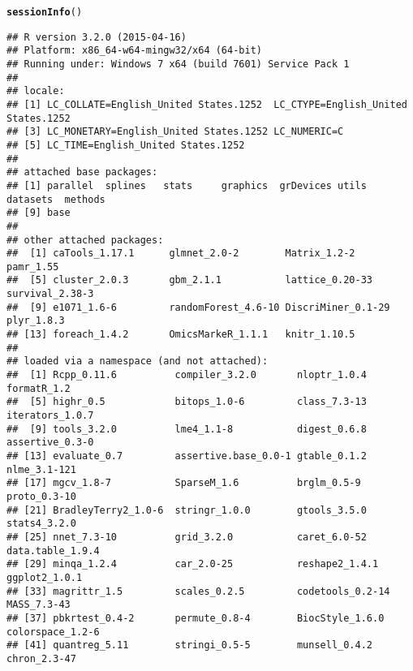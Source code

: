\documentclass[12pt]{article}\usepackage[]{graphicx}\usepackage[usenames,dvipsnames]{color}
\makeatletter
\newcommand{\hlstd}[1]{\textcolor[rgb]{0.345,0.345,0.345}{#1}}%
\newcommand{\hlkwd}[1]{\textcolor[rgb]{0.737,0.353,0.396}{\textbf{#1}}}%
\newenvironment{kframe}{%
 \def\at@end@of@kframe{}%
 \ifinner\ifhmode%
  \def\at@end@of@kframe{\end{minipage}}%
  \begin{minipage}{\columnwidth}%
 \fi\fi%
 \def\FrameCommand##1{\hskip\@totalleftmargin \hskip-\fboxsep
 \colorbox{shadecolor}{##1}\hskip-\fboxsep
     \hskip-\linewidth \hskip-\@totalleftmargin \hskip\columnwidth}%
 \MakeFramed {\advance\hsize-\width
   \@totalleftmargin\z@ \linewidth\hsize
   \@setminipage}}%
 {\par\unskip\endMakeFramed%
 \at@end@of@kframe}
\newenvironment{knitrout}{}{} %
\makeatother
\begin{document}
\newpage
\begin{knitrout}
\color{fgcolor}\begin{kframe}
\begin{alltt}
\hlkwd{sessionInfo}\hlstd{()}
\end{alltt}
\begin{verbatim}
## R version 3.2.0 (2015-04-16)
## Platform: x86_64-w64-mingw32/x64 (64-bit)
## Running under: Windows 7 x64 (build 7601) Service Pack 1
## 
## locale:
## [1] LC_COLLATE=English_United States.1252  LC_CTYPE=English_United States.1252   
## [3] LC_MONETARY=English_United States.1252 LC_NUMERIC=C                          
## [5] LC_TIME=English_United States.1252    
## 
## attached base packages:
## [1] parallel  splines   stats     graphics  grDevices utils     datasets  methods  
## [9] base     
## 
## other attached packages:
##  [1] caTools_1.17.1      glmnet_2.0-2        Matrix_1.2-2        pamr_1.55          
##  [5] cluster_2.0.3       gbm_2.1.1           lattice_0.20-33     survival_2.38-3    
##  [9] e1071_1.6-6         randomForest_4.6-10 DiscriMiner_0.1-29  plyr_1.8.3         
## [13] foreach_1.4.2       OmicsMarkeR_1.1.1   knitr_1.10.5       
## 
## loaded via a namespace (and not attached):
##  [1] Rcpp_0.11.6          compiler_3.2.0       nloptr_1.0.4         formatR_1.2         
##  [5] highr_0.5            bitops_1.0-6         class_7.3-13         iterators_1.0.7     
##  [9] tools_3.2.0          lme4_1.1-8           digest_0.6.8         assertive_0.3-0     
## [13] evaluate_0.7         assertive.base_0.0-1 gtable_0.1.2         nlme_3.1-121        
## [17] mgcv_1.8-7           SparseM_1.6          brglm_0.5-9          proto_0.3-10        
## [21] BradleyTerry2_1.0-6  stringr_1.0.0        gtools_3.5.0         stats4_3.2.0        
## [25] nnet_7.3-10          grid_3.2.0           caret_6.0-52         data.table_1.9.4    
## [29] minqa_1.2.4          car_2.0-25           reshape2_1.4.1       ggplot2_1.0.1       
## [33] magrittr_1.5         scales_0.2.5         codetools_0.2-14     MASS_7.3-43         
## [37] pbkrtest_0.4-2       permute_0.8-4        BiocStyle_1.6.0      colorspace_1.2-6    
## [41] quantreg_5.11        stringi_0.5-5        munsell_0.4.2        chron_2.3-47
\end{verbatim}
\end{kframe}
\end{knitrout}
\end{document}
